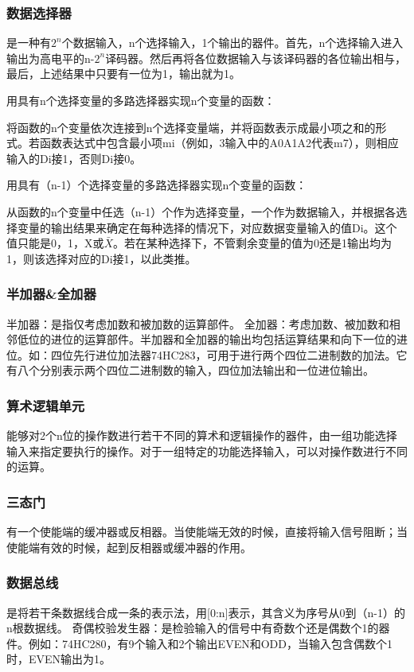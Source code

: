 \documentclass{article}
\begin{document}
	\subsubsection{数据选择器}
	是一种有$2^n$个数据输入，n个选择输入，1个输出的器件。首先，n个选择输入进入输出为高电平的n-$2^n$译码器。然后再将各位数据输入与该译码器的各位输出相与，最后，上述结果中只要有一位为1，输出就为1。\par
	用具有n个选择变量的多路选择器实现n个变量的函数：\par
	将函数的n个变量依次连接到n个选择变量端，并将函数表示成最小项之和的形式。若函数表达式中包含最小项mi（例如，3输入中的A0A1A2代表m7），则相应输入的Di接1，否则Di接0。\par
	用具有（n-1）个选择变量的多路选择器实现n个变量的函数：\par
	从函数的n个变量中任选（n-1）个作为选择变量，一个作为数据输入，并根据各选择变量的输出结果来确定在每种选择的情况下，对应数据变量输入的值Di。这个值只能是0，1，X或$\bar{X}$。若在某种选择下，不管剩余变量的值为0还是1输出均为1，则该选择对应的Di接1，以此类推。\par
	\subsubsection{半加器\&全加器}
	半加器：是指仅考虑加数和被加数的运算部件。
	全加器：考虑加数、被加数和相邻低位的进位的运算部件。半加器和全加器的输出均包括运算结果和向下一位的进位。如：四位先行进位加法器74HC283，可用于进行两个四位二进制数的加法。它有八个分别表示两个四位二进制数的输入，四位加法输出和一位进位输出。
	
	\subsubsection{算术逻辑单元}
	能够对2个n位的操作数进行若干不同的算术和逻辑操作的器件，由一组功能选择输入来指定要执行的操作。对于一组特定的功能选择输入，可以对操作数进行不同的运算。
	\subsubsection{三态门}
	有一个使能端的缓冲器或反相器。当使能端无效的时候，直接将输入信号阻断；当使能端有效的时候，起到反相器或缓冲器的作用。
	\subsubsection{数据总线}
	是将若干条数据线合成一条的表示法，用[0:n]表示，其含义为序号从0到（n-1）的n根数据线。
	奇偶校验发生器：是检验输入的信号中有奇数个还是偶数个1的器件。例如：74HC280，有9个输入和2个输出EVEN和ODD，当输入包含偶数个1时，EVEN输出为1。
\end{document}
